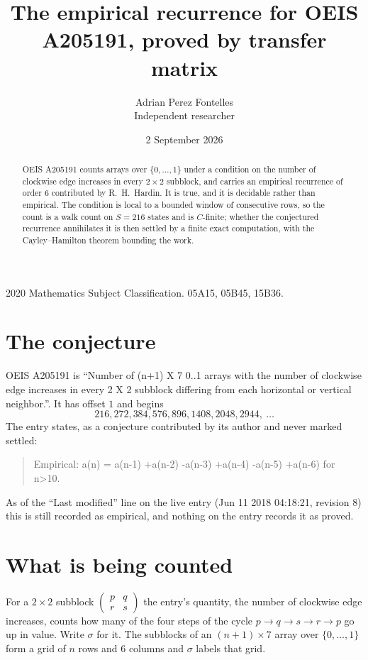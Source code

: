 \documentclass[11pt,a4paper]{article}
\title{The empirical recurrence for OEIS A205191, proved by transfer matrix}
\author{Adrian Perez Fontelles\\ \small Independent researcher}
\date{2 September 2026}
\theoremstyle{plain}
\theoremstyle{definition}
\begin{document}
\maketitle

\begin{abstract}
OEIS A205191 counts arrays over $\{0,\dots,1\}$ under a condition on the number of clockwise edge increases
in every $2\times2$ subblock, and carries an empirical recurrence of order $6$ contributed by
R.~H.~Hardin. It is true, and it is decidable rather than empirical. The condition is local to
a bounded window of consecutive rows, so the count is a walk count on $S=216$ states and is
$C$-finite; whether the conjectured recurrence annihilates it is then settled by a finite exact
computation, with the Cayley--Hamilton theorem bounding the work.
\end{abstract}

\noindent\small 2020 Mathematics Subject Classification. 05A15, 05B45, 15B36.\normalsize

\section{The conjecture}

OEIS A205191 is ``Number of (n+1) X 7 0..1 arrays with the number of clockwise edge increases in every 2 X 2 subblock differing from each horizontal or vertical neighbor.''. It has offset $1$ and begins
\[
216, 272, 384, 576, 896, 1408, 2048, 2944,\ \dots
\]
The entry states, as a conjecture contributed by its author and never marked settled:
\begin{quote}
Empirical: a(n) = a(n-1) +a(n-2) -a(n-3) +a(n-4) -a(n-5) +a(n-6) for n>10.
\end{quote}
As of the ``Last modified'' line on the live entry (Jun 11 2018 04:18:21, revision 8) this is still
recorded as empirical, and nothing on the entry records it as proved.

\section{What is being counted}

For a $2\times2$ subblock $\begin{pmatrix}p&q\\r&s\end{pmatrix}$ the
entry's quantity, the number of clockwise edge increases, counts how many of the four steps of the cycle $p\to q\to s\to r\to p$ go up in value. Write $\sigma$ for it. The subblocks of an
$(n+1)\times7$ array over $\{0,\dots,1\}$ form a grid of $n$ rows and $6$
columns and $\sigma$ labels that grid.
\end{document}
